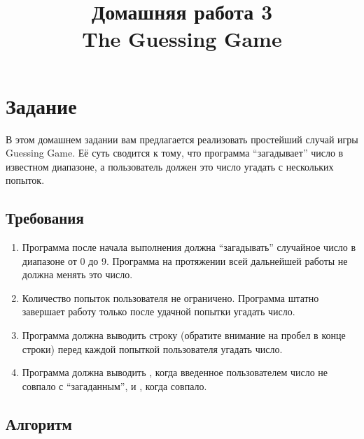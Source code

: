 \documentclass[14pt]{extarticle}
\title{Домашняя работа 3 \\ The Guessing Game}
\begin{document}
\maketitle

\tableofcontents

\section{Задание} \label{requirements}

    В этом домашнем задании вам предлагается реализовать простейший случай
    игры Guessing Game.
    Её суть сводится к тому, что программа \enquote{загадывает} число в известном
    диапазоне, а пользователь должен это число угадать с нескольких попыток.

    \subsection{Требования}

        \begin{enumerate}

            \item Программа после начала выполнения должна \enquote{загадывать} случайное число в
                диапазоне от 0 до 9.
                Программа на протяжении всей дальнейшей работы не должна менять это число.

            \item Количество попыток пользователя не ограничено.
                Программа штатно завершает работу только после удачной попытки угадать число.

            \item Программа должна выводить строку 
                (обратите внимание на пробел в конце строки) перед каждой попыткой
                пользователя угадать число.

            \item Программа должна выводить , когда введенное пользователем число
                не совпало с \enquote{загаданным}, и , когда совпало. 
            
        \end{enumerate}

    \subsection{Алгоритм}
\end{document}
